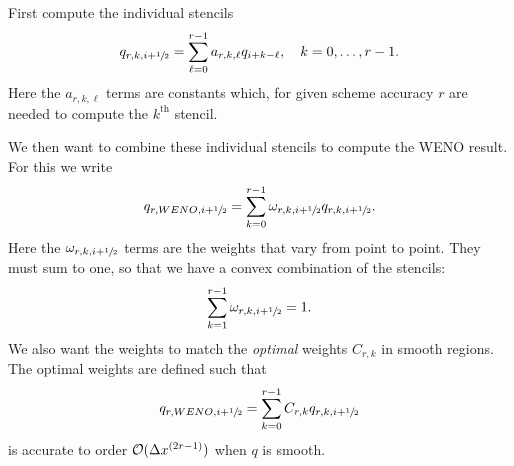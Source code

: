 First compute the individual stencils
\begin{equation}
  \label{eq:weno-stencils}
  q_{r, k, i+{\sfrac{1}{2}}} = \sum_{\ell=0}^{r-1} a_{r, k, \ell} q_{i+k-\ell}, \quad k = 0, \dots, r-1.
\end{equation}
Here the $a_{r, k, \ell}$ terms are constants which, for given scheme accuracy
$r$ are needed to compute the $k^{\text{th}}$ stencil.

We then want to combine these individual stencils to compute the WENO result.
For this we write
\begin{equation}
  \label{eq:weno-reconstruction}
  q_{r, WENO, i+{\sfrac{1}{2}}} = \sum_{k=0}^{r-1} \omega_{r, k, i+{\sfrac{1}{2}}} q_{r, k, i+{\sfrac{1}{2}}}.
\end{equation}
Here the $\omega_{r, k, i+{\sfrac{1}{2}}}$ terms are the weights that vary from point
to point. They must sum to one, so that we have a convex combination of the
stencils:
\begin{equation}
  \label{eq:weno-convex}
  \sum_{k=1}^{r-1} \omega_{r, k, i+{\sfrac{1}{2}}} = 1.
\end{equation}
We also want the weights to match the \emph{optimal} weights $C_{r, k}$ in
smooth regions. The optimal weights are defined such that
\begin{equation}
  \label{eq:weno-optimal}
  q_{r, WENO, i+{\sfrac{1}{2}}} = \sum_{k=0}^{r-1} C_{r, k} q_{r, k, i+{\sfrac{1}{2}}}
\end{equation}
is accurate to order ${\cal O}(\Delta x^{(2 r - 1)})$ when $q$ is smooth.

